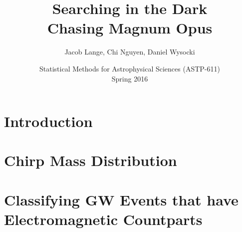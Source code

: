\documentclass[12pt]{article}
\title{
Searching in the Dark
\\
Chasing Magnum Opus
}
\author{
  Jacob Lange, Chi Nguyen, Daniel Wysocki
}
\date{
  Statistical Methods for Astrophysical Sciences (ASTP-611)
  \\
  Spring 2016
}
\begin{document}
\maketitle


\section{Introduction}
\label{sec:intro}

\section{Chirp Mass Distribution}
\label{sec:dist}





\section{Classifying GW Events that have Electromagnetic Countparts}
\label{sec:classifier}


%
\end{document}
